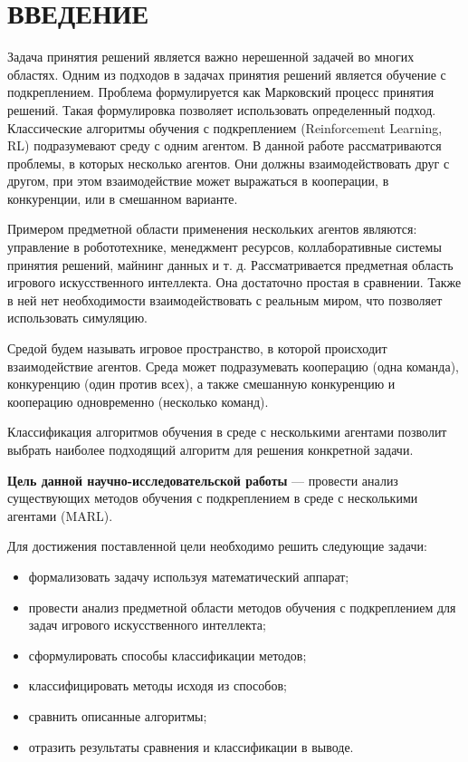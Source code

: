 \chapter*{\hfill{\centering ВВЕДЕНИЕ }\hfill}

Задача принятия решений является важно нерешенной задачей во многих областях.
Одним из подходов в задачах принятия решений является обучение с подкреплением.
Проблема формулируется как Марковский процесс принятия решений. Такая формулировка позволяет использовать определенный подход.
Классические алгоритмы обучения с подкреплением (Reinforcement \newline Learning, RL) подразумевают среду с одним агентом.
В данной работе рассматриваются проблемы, в которых несколько агентов. 
Они должны взаимодействовать друг с другом, при этом взаимодействие может выражаться в кооперации, в конкуренции, или в смешанном варианте.


Примером предметной области применения нескольких агентов являются: управление в робототехнике, менеджмент ресурсов, коллаборативные системы принятия решений, майнинг данных и т. д.
Рассматривается предметная область игрового искусственного интеллекта.
Она достаточно простая в сравнении. Также в ней нет необходимости взаимодействовать с реальным миром, что позволяет использовать симуляцию.

Средой будем называть игровое пространство, в которой происходит взаимодействие агентов.
Среда может подразумевать кооперацию (одна команда), конкуренцию (один против всех), а также смешанную конкуренцию и кооперацию одновременно (несколько команд).

Классификация алгоритмов обучения в среде с несколькими агентами позволит выбрать наиболее подходящий алгоритм для решения конкретной задачи.

\textbf{Цель данной научно-исследовательской работы} --- провести анализ существующих методов обучения с подкреплением в среде с несколькими агентами (MARL).

Для достижения поставленной цели необходимо решить следующие задачи:
\begin{itemize}[label=---]
	\item формализовать задачу используя математический аппарат;
	\item провести анализ предметной области методов обучения с подкреплением для задач игрового искусственного интеллекта;
	\item сформулировать способы классификации методов;
	\item классифицировать методы исходя из способов;
	\item сравнить описанные алгоритмы;
	\item отразить результаты сравнения и классификации в выводе.
\end{itemize}


